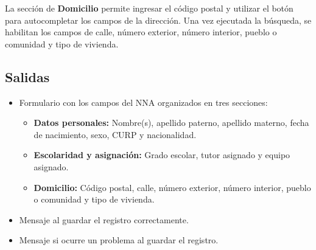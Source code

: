 La sección de \textbf{Domicilio} permite ingresar el código postal y utilizar el botón  para autocompletar los campos de la dirección. Una vez ejecutada la búsqueda, se habilitan los campos de calle, número exterior, número interior, pueblo o comunidad y tipo de vivienda.


\subsection{Salidas}
\begin{itemize}
	\item Formulario con los campos del NNA organizados en tres secciones:
	\begin{itemize}
		\item \textbf{Datos personales:} Nombre(s), apellido paterno, apellido materno, fecha de nacimiento, sexo, CURP y nacionalidad.
		\item \textbf{Escolaridad y asignación:} Grado escolar, tutor asignado y equipo asignado.
		\item \textbf{Domicilio:} Código postal, calle, número exterior, número interior, pueblo o comunidad y tipo de vivienda.
	\end{itemize}
	\item Mensaje  al guardar el registro correctamente.
	\item Mensaje  si ocurre un problema al guardar el registro.
\end{itemize}

